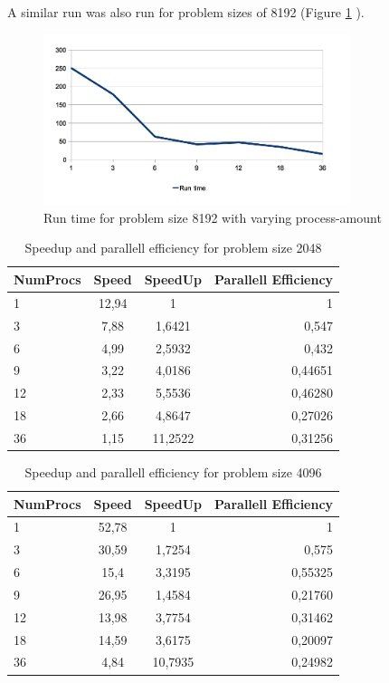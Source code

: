 A similar run was also run for problem sizes of 8192 (Figure \ref{numprocs8192} ).

\begin{figure}[t]
  \centering
    \includegraphics[width=0.8\textwidth]{RunTimePerProcess8192.png}
    \caption{Run time for problem size 8192 with varying process-amount}
    \label{numprocs8192}
\end{figure}

\begin{table}[t]
  \centering
    \begin{tabular}{l | c | c | r}
        NumProcs & Speed & SpeedUp & Parallell Efficiency \\
        \hline
        1 & 12,94 & 1 & 1 \\
        3 & 7,88 & 1,6421 & 0,547 \\
        6 & 4,99 & 2,5932 & 0,432 \\
        9 & 3,22 & 4,0186 & 0,44651 \\
        12 & 2,33 & 5,5536 & 0,46280 \\
        18 & 2,66 & 4,8647 & 0,27026 \\
        36 & 1,15 & 11,2522 & 0,31256 \\
        \hline
    \end{tabular}
    \caption{Speedup and parallell efficiency for problem size 2048}
\end{table}

\begin{table}[ht]
  \centering
    \begin{tabular}{l | c | c | r}
        NumProcs & Speed & SpeedUp & Parallell Efficiency \\
        \hline
        1 & 52,78 & 1 & 1 \\
        3 & 30,59 & 1,7254 & 0,575 \\
        6 & 15,4 & 3,3195 & 0,55325 \\
        9 & 26,95 & 1,4584 & 0,21760 \\
        12 & 13,98 & 3,7754 & 0,31462 \\
        18 & 14,59 & 3,6175 & 0,20097 \\
        36 & 4,84 & 10,7935 & 0,24982 \\
        \hline
    \end{tabular}
    \caption{Speedup and parallell efficiency for problem size 4096}
\end{table}

